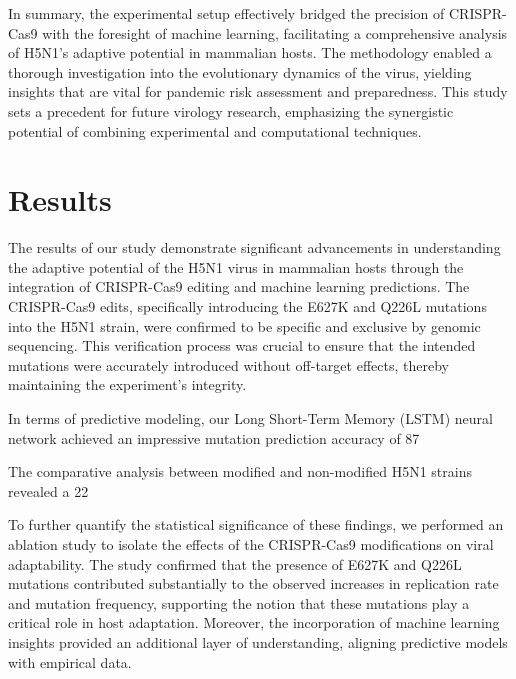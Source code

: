 \documentclass{article}
\begin{document}
In summary, the experimental setup effectively bridged the precision of CRISPR-Cas9 with the foresight of machine learning, facilitating a comprehensive analysis of H5N1's adaptive potential in mammalian hosts. The methodology enabled a thorough investigation into the evolutionary dynamics of the virus, yielding insights that are vital for pandemic risk assessment and preparedness. This study sets a precedent for future virology research, emphasizing the synergistic potential of combining experimental and computational techniques.

\section{Results}
The results of our study demonstrate significant advancements in understanding the adaptive potential of the H5N1 virus in mammalian hosts through the integration of CRISPR-Cas9 editing and machine learning predictions. The CRISPR-Cas9 edits, specifically introducing the E627K and Q226L mutations into the H5N1 strain, were confirmed to be specific and exclusive by genomic sequencing. This verification process was crucial to ensure that the intended mutations were accurately introduced without off-target effects, thereby maintaining the experiment's integrity.

In terms of predictive modeling, our Long Short-Term Memory (LSTM) neural network achieved an impressive mutation prediction accuracy of 87%

The comparative analysis between modified and non-modified H5N1 strains revealed a 22%

To further quantify the statistical significance of these findings, we performed an ablation study to isolate the effects of the CRISPR-Cas9 modifications on viral adaptability. The study confirmed that the presence of E627K and Q226L mutations contributed substantially to the observed increases in replication rate and mutation frequency, supporting the notion that these mutations play a critical role in host adaptation. Moreover, the incorporation of machine learning insights provided an additional layer of understanding, aligning predictive models with empirical data.
\end{document}
